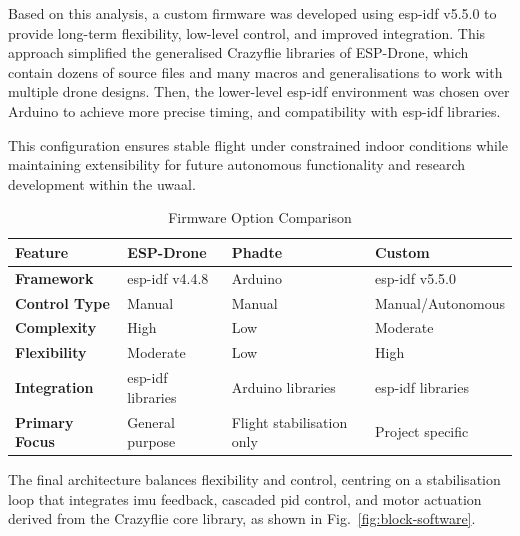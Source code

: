 Based on this analysis, a custom firmware was developed using \gls{esp-idf} v5.5.0 to provide long-term flexibility, low-level control, and improved integration. This approach simplified the generalised Crazyflie libraries of ESP-Drone, which contain dozens of source files and many macros and generalisations to work with multiple drone designs. Then, the lower-level \gls{esp-idf} environment was chosen over Arduino to achieve more precise timing, and compatibility with \gls{esp-idf} libraries.

This configuration ensures stable flight under constrained indoor conditions while maintaining extensibility for future autonomous functionality and research development within the \gls{uwaal}.

\begin{table}[H]
\centering
\renewcommand{\arraystretch}{1.2}
\caption{Firmware Option Comparison}
\begin{tabular}{|>{\bfseries}p{}|p{}|p{}|p{}|}
\hline
\rowcolor{gray!15}
\textbf{Feature} & \textbf{ESP-Drone} & \textbf{Phadte} & \textbf{Custom} \\
\hline
Framework & \gls{esp-idf} v4.4.8 & Arduino & \gls{esp-idf} v5.5.0 \\
\hline
Control Type & Manual & Manual & Manual/Autonomous \\
\hline
Complexity & High & Low & Moderate \\
\hline
Flexibility & Moderate & Low & High \\
\hline
Integration & \gls{esp-idf} libraries & Arduino libraries & \gls{esp-idf} libraries \\
\hline
Primary Focus & General purpose & Flight stabilisation only & Project specific \\
\hline
\end{tabular}
\end{table}

The final architecture balances flexibility and control, centring on a stabilisation loop that integrates \gls{imu} feedback, cascaded \gls{pid} control, and motor actuation derived from the Crazyflie core library, as shown in Fig.~\ref{fig:block-software}.


